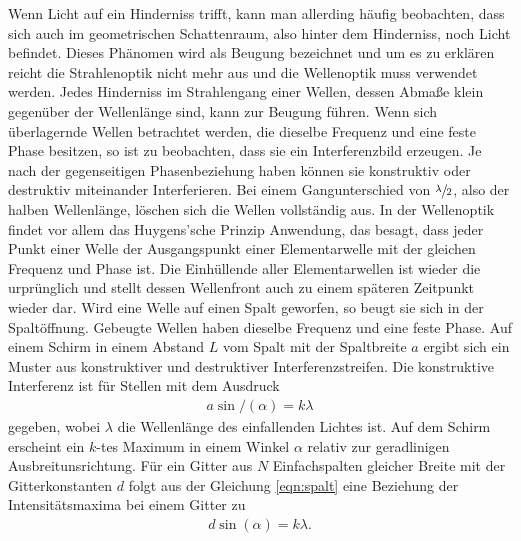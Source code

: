 \noindent
Wenn Licht auf ein Hinderniss trifft, kann man allerding häufig beobachten, dass sich auch im geometrischen Schattenraum, also hinter dem Hinderniss, noch Licht befindet.
Dieses Phänomen wird als Beugung bezeichnet und um es zu erklären reicht die Strahlenoptik nicht mehr aus und die Wellenoptik muss verwendet werden. \newline
Jedes Hinderniss im Strahlengang einer Wellen, dessen Abmaße klein gegenüber der Wellenlänge sind, kann zur Beugung führen.
Wenn sich überlagernde Wellen betrachtet werden, die dieselbe Frequenz und eine feste Phase besitzen, so ist zu beobachten, dass sie ein Interferenzbild erzeugen. Je nach
der gegenseitigen Phasenbeziehung haben können sie konstruktiv oder destruktiv miteinander Interferieren. Bei einem Gangunterschied von $\sfrac{\lambda}{2}$, also der halben Wellenlänge,
löschen sich die Wellen vollständig aus.
In der Wellenoptik findet vor allem das Huygens'sche Prinzip Anwendung, das besagt, dass jeder Punkt einer Welle der Ausgangspunkt einer Elementarwelle mit der gleichen Frequenz und Phase ist.
Die Einhüllende aller Elementarwellen ist wieder die urprünglich und stellt dessen Wellenfront auch zu einem späteren Zeitpunkt wieder dar. \newline
Wird eine Welle auf einen Spalt geworfen, so beugt sie sich in der Spaltöffnung. Gebeugte Wellen haben dieselbe Frequenz und eine feste Phase. Auf einem Schirm in einem Abstand $L$ vom Spalt mit der Spaltbreite $a$
ergibt sich ein Muster aus konstruktiver und destruktiver Interferenzstreifen. Die konstruktive Interferenz ist für Stellen mit dem Ausdruck
\begin{align}
    a\sin/(\alpha)=k\lambda
    \label{eqn:spalt}
\end{align}
gegeben, wobei $\lambda$ die Wellenlänge des einfallenden Lichtes ist. Auf dem Schirm erscheint ein $k$-tes Maximum in einem Winkel $\alpha$ relativ zur geradlinigen Ausbreitunsrichtung.
Für ein Gitter aus $N$ Einfachspalten gleicher Breite mit der Gitterkonstanten $d$ folgt aus der Gleichung \eqref{eqn:spalt} eine Beziehung der Intensitätsmaxima bei einem Gitter zu
\begin{align}
    d\sin(\alpha)=k\lambda.
\end{align}